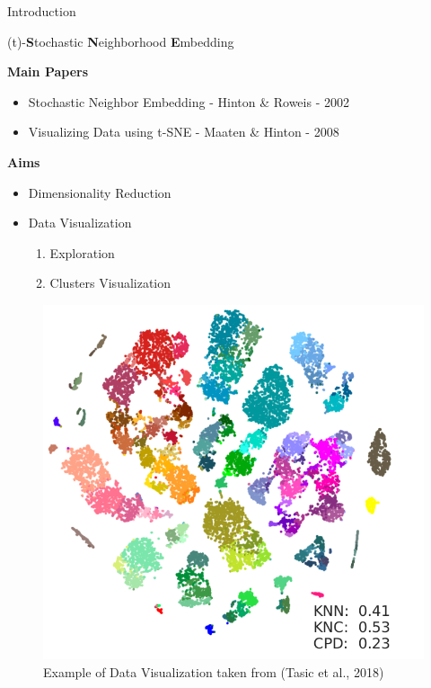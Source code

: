 \documentclass[10pt]{beamer}
\theoremstyle{definition}
\newcommand{\1}{\mathbbm{1}}
\begin{document}
\begin{frame}{Introduction}{}
  \begin{center}
    (t)-{\bf S}tochastic {\bf N}eighborhood {\bf E}mbedding
  \end{center}
  \begin{minipage}{0.53\textwidth}
    {\bf Main Papers}
    \begin{itemize}
      \item Stochastic Neighbor Embedding - Hinton \& Roweis - 2002\\
      \item Visualizing Data using t-SNE - Maaten \& Hinton - 2008\\
    \end{itemize}
    \vspace{0.75cm}
    {\bf Aims}
    \begin{itemize}
      \item Dimensionality Reduction
      \item Data Visualization
        \begin{enumerate}
          \item Exploration
          \item Clusters Visualization
        \end{enumerate}
    \end{itemize}
  \end{minipage}\hfill
  \begin{minipage}{0.4\textwidth}
    \begin{figure}[h!]
      \centering
      \includegraphics[scale=0.2]{./pic/example.png}
      \caption{Example of Data Visualization taken from (Tasic et al., 2018)}
    \end{figure}
  \end{minipage} 
\end{frame}
\end{document}
